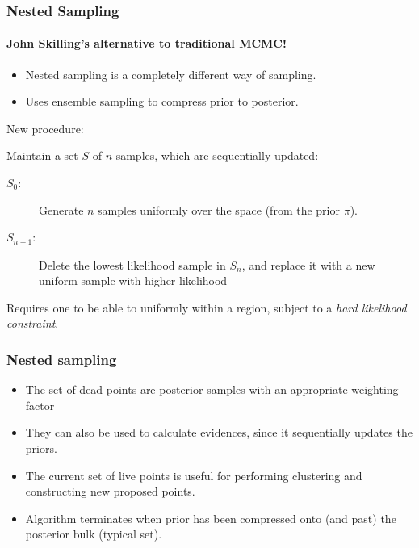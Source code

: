 \documentclass[%
]{beamer}
\newcommand{\prior}{\pi}
\begin{document}
\begin{frame}
  \frametitle{Nested Sampling} 
  \framesubtitle{John Skilling's alternative to traditional MCMC!} 

  \begin{itemize}
    \item Nested sampling is a completely different way of sampling. 
    \item Uses ensemble sampling to compress prior to posterior.
  \end{itemize}
  
  New procedure: 

  
  Maintain a set $S$ of $n$ samples, which are sequentially updated:

  \begin{description}
      
    \item[$S_0$:] Generate $n$ samples uniformly over the space (from the prior $\prior$). 
      
    \item[$S_{n+1}$:] Delete the lowest likelihood sample in $S_{n}$, and replace it with a new uniform sample with higher likelihood
  \end{description}

  
  Requires one to be able to uniformly within a region, subject to a {\em hard likelihood constraint}.

\end{frame}




\begin{frame}
  \frametitle{Nested sampling} 

  \begin{itemize}
    \item The set of dead points are posterior samples with an appropriate weighting factor
    \item They can also be used to calculate evidences, since it sequentially updates the priors.
    \item The current set of live points is useful for performing clustering and constructing new proposed points.
    \item Algorithm terminates when prior has been compressed onto (and past) the posterior bulk (typical set).
  \end{itemize}
 
\end{frame}
\end{document}
